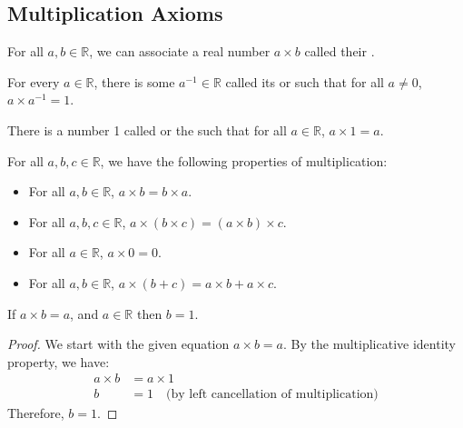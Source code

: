\documentclass[11pt]{article}
\begin{document}
\subsection{Multiplication Axioms}

\begin{definition}
	For all $a, b \in \mathbb{R}$, we can associate a real number $a \times b$ called their .
\end{definition}

\begin{definition}
	For every $a \in \mathbb{R}$, there is some $a^{-1} \in \mathbb{R}$ called its  or  such that for all $a \neq 0$, $a \times a^{-1} = 1$.
\end{definition}

\begin{definition}
	There is a number 1 called  or the  such that for all $a \in \mathbb{R}$, $a \times 1 = a$.
\end{definition}

\begin{definition}
	For all $a, b, c \in \mathbb{R}$, we have the following properties of multiplication:
	\begin{itemize}
		\item For all $a, b \in \mathbb{R}$, $a \times b = b \times a$.
		\item For all $a, b, c \in \mathbb{R}$, $a \times (b \times c) = (a \times b) \times
			      c$.
		\item For all $a \in \mathbb{R}$, $a \times 0 = 0$.
		\item For all $a, b \in \mathbb{R}$, $a \times (b + c) = a \times b + a \times c$.
	\end{itemize}
\end{definition}

\begin{proposition}
	If $a \times b = a$, and $a \in \mathbb{R}$ then $b = 1$.
\end{proposition}

\begin{proof}
	We start with the given equation $a \times b = a$. By the multiplicative identity property, we have:
	\begin{align*}
		a \times b & = a \times 1                                              \\
		b          & = 1 \quad \text{(by left cancellation of multiplication)}
	\end{align*}
	Therefore, $b = 1$.
\end{proof}
\end{document}
